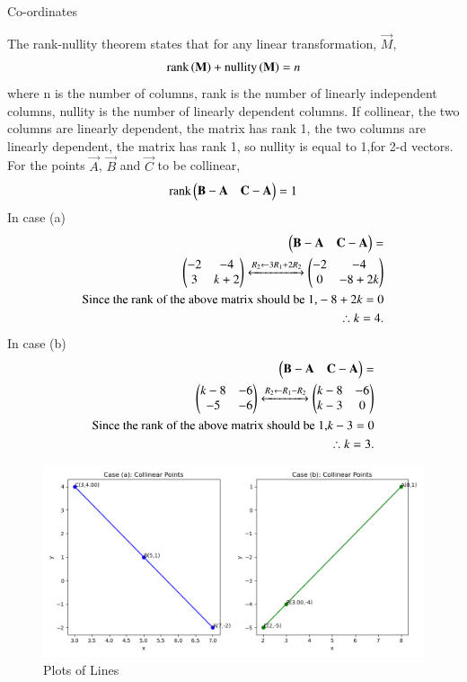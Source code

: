 \documentclass[journal]{IEEEtran}
\begin{document}
\begin{table}[h!]    
  \centering
  
  \caption{Co-ordinates}
  \label{tab1.6.6.1}
\end{table}
The rank-nullity theorem states that for any linear transformation, $\vec{M}$, 
\begin{align}
	\text{rank}\left(\mathbf{M}\right)+\text{nullity}\left(\mathbf{M}\right)=n
\end{align}
where n is the number of columns, rank is the number of linearly independent columns, nullity is the number of linearly dependent columns. If collinear, the two columns are linearly dependent, the matrix has rank 1, the two columns are linearly dependent, the matrix has rank 1, so nullity is equal to 1,for 2-d vectors. \\
For the points $\vec{A}$, $\vec{B}$  and  $\vec{C}$ to be collinear,
\begin{align}
	\text{rank} \begin{pmatrix} \mathbf{B-A} & \mathbf{C-A}\end{pmatrix}=1
\end{align}
In case (a)
\begin{align*}
\begin{pmatrix} \mathbf{B-A} & \mathbf{C-A}\end{pmatrix}=\\
\begin{pmatrix} -2 & -4 \\ 3 & k+2\end{pmatrix} 
\xleftrightarrow[]{R_2 \leftarrow {3R_1+2R_2}}
\begin{pmatrix}-2 & -4 \\ 0 & -8+2k\end{pmatrix} \\
\text{Since the rank of the above matrix should be 1,}
-8+2k=0\\
\therefore k=4.
\end{align*}
In case (b)
\begin{align*}
\begin{pmatrix} \mathbf{B-A} & \mathbf{C-A}\end{pmatrix}=\\
\begin{pmatrix} k-8 & -6 \\ -5 & -6\end{pmatrix} 
\xleftrightarrow[]{R_2 \leftarrow {R_1-R_2}}
\begin{pmatrix}k-8 & -6 \\ k-3 & 0\end{pmatrix} \\
\text{Since the rank of the above matrix should be 1,}
k-3=0\\
\therefore k=3.
\end{align*}







\begin{figure}[h!]
   \centering
   \includegraphics[width=0.7\linewidth]{figs/Figure_1.png}
   \caption{Plots of Lines}
   \label{plot}
\end{figure}
\end{document}
